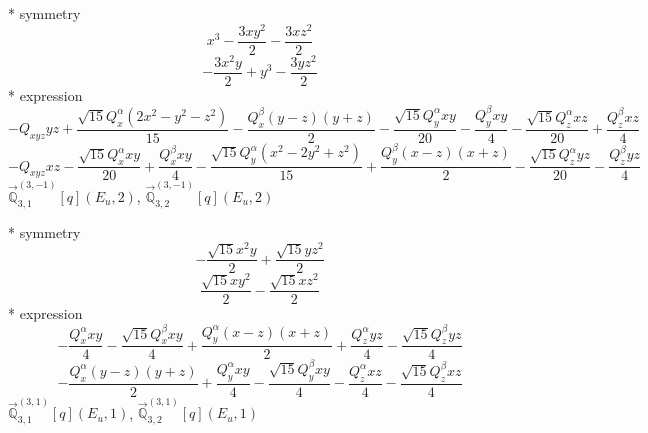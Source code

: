 \documentclass[fleqn,8pt]{jsarticle}
\begin{document}
\noindent\quad ** symmetry
\begin{dmath*}
x^{3} - \frac{3 x y^{2}}{2} - \frac{3 x z^{2}}{2}
\end{dmath*}
\begin{dmath*}
- \frac{3 x^{2} y}{2} + y^{3} - \frac{3 y z^{2}}{2}
\end{dmath*}
\noindent\quad ** expression
\begin{dmath*}
- Q_{xyz} y z + \frac{\sqrt{15} Q_{x}^{\alpha} \left(2 x^{2} - y^{2} - z^{2}\right)}{15} - \frac{Q_{x}^{\beta} \left(y - z\right) \left(y + z\right)}{2} - \frac{\sqrt{15} Q_{y}^{\alpha} x y}{20} - \frac{Q_{y}^{\beta} x y}{4} - \frac{\sqrt{15} Q_{z}^{\alpha} x z}{20} + \frac{Q_{z}^{\beta} x z}{4}
\end{dmath*}
\begin{dmath*}
- Q_{xyz} x z - \frac{\sqrt{15} Q_{x}^{\alpha} x y}{20} + \frac{Q_{x}^{\beta} x y}{4} - \frac{\sqrt{15} Q_{y}^{\alpha} \left(x^{2} - 2 y^{2} + z^{2}\right)}{15} + \frac{Q_{y}^{\beta} \left(x - z\right) \left(x + z\right)}{2} - \frac{\sqrt{15} Q_{z}^{\alpha} y z}{20} - \frac{Q_{z}^{\beta} y z}{4}
\end{dmath*}
\noindent\quad $\vec{\mathbb{Q}}_{3,1}^{(3,-1)}[q](E_{u},2)$, $\vec{\mathbb{Q}}_{3,2}^{(3,-1)}[q](E_{u},2)$

\noindent\quad ** symmetry
\begin{dmath*}
- \frac{\sqrt{15} x^{2} y}{2} + \frac{\sqrt{15} y z^{2}}{2}
\end{dmath*}
\begin{dmath*}
\frac{\sqrt{15} x y^{2}}{2} - \frac{\sqrt{15} x z^{2}}{2}
\end{dmath*}
\noindent\quad ** expression
\begin{dmath*}
- \frac{Q_{x}^{\alpha} x y}{4} - \frac{\sqrt{15} Q_{x}^{\beta} x y}{4} + \frac{Q_{y}^{\alpha} \left(x - z\right) \left(x + z\right)}{2} + \frac{Q_{z}^{\alpha} y z}{4} - \frac{\sqrt{15} Q_{z}^{\beta} y z}{4}
\end{dmath*}
\begin{dmath*}
- \frac{Q_{x}^{\alpha} \left(y - z\right) \left(y + z\right)}{2} + \frac{Q_{y}^{\alpha} x y}{4} - \frac{\sqrt{15} Q_{y}^{\beta} x y}{4} - \frac{Q_{z}^{\alpha} x z}{4} - \frac{\sqrt{15} Q_{z}^{\beta} x z}{4}
\end{dmath*}
\noindent\quad $\vec{\mathbb{Q}}_{3,1}^{(3,1)}[q](E_{u},1)$, $\vec{\mathbb{Q}}_{3,2}^{(3,1)}[q](E_{u},1)$
\end{document}
